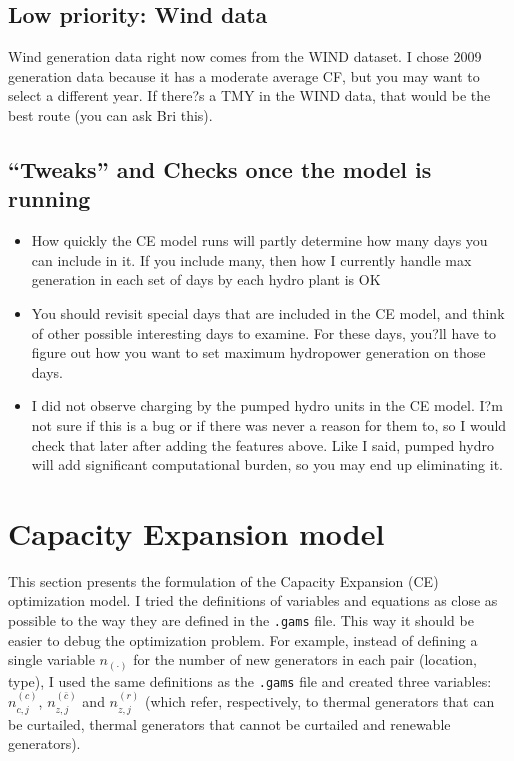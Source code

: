 \documentclass[11pt, oneside]{article}   	%
\newcommand{\bc}{\bar{c}}
\begin{document}
\subsection{Low priority: Wind data}

Wind generation data right now comes from the WIND dataset. I chose 2009 generation data because it has a moderate average CF, but you may want to select a different year. If there?s a TMY in the WIND data, that would be the best route (you can ask Bri this). 

\subsection{``Tweaks'' and Checks once the model is running}

\begin{itemize}
\item How quickly the CE model runs will partly determine how many days you can include in it. If you include many, then how I currently handle max generation in each set of days by each hydro plant is OK
\item You should revisit special days that are included in the CE model, and think of other possible interesting days to examine. For these days, you?ll have to figure out how you want to set maximum hydropower generation on those days. 
\item I did not observe charging by the pumped hydro units in the CE model. I?m not sure if this is a bug or if there was never a reason for them to, so I would check that later after adding the features above. Like I said, pumped hydro will add significant computational burden, so you may end up eliminating it.
\end{itemize}


\newpage
\section{Capacity Expansion model}

This section presents the formulation of the Capacity Expansion (CE) optimization model. I tried the definitions of variables and equations as close as possible to the way they are defined in the \texttt{.gams} file. This way it should be easier to debug the optimization problem. For example, instead of defining a single variable $n_{(\cdot)}$ for the number of new generators in each pair (location, type), I used the same definitions as the \texttt{.gams} file and created three variables: $n^{(c)}_{c, j}$, $n^{(\bc)}_{z, j}$ and $n^{(r)}_{z, j}$ (which refer, respectively, to thermal generators that can be curtailed, thermal generators that cannot be curtailed and renewable generators).
\end{document}
